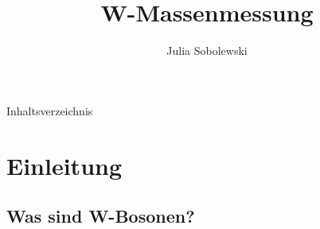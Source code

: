 \documentclass[aspectratio=1610, 9pt]{beamer}
\title{W-Massenmessung}
\author[Julia ~Sobolewski]{Julia Sobolewski}
\institute[Fakultät Physik]{Fakultät Physik}
\begin{document}
\maketitle

\begin{frame}[allowframebreaks]{Inhaltsverzeichnis}
  \tableofcontents
\end{frame}

\section{Einleitung}

\subsection{Was sind W-Bosonen?}
\end{document}
